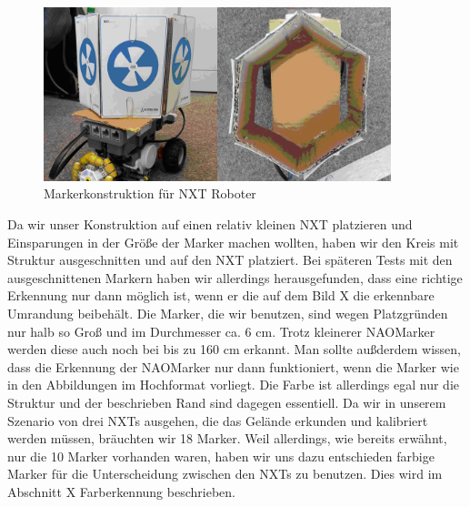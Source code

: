 \begin{figure}[ht]
    \centering
  \includegraphics[width=0.9\textwidth, angle=0]{img/nao_8.png}
    \caption{Markerkonstruktion für NXT Roboter}
    \label{nao_marker2}
\end{figure}

Da wir unser Konstruktion auf einen relativ kleinen NXT platzieren und Einsparungen in der Größe der Marker machen wollten, haben wir den Kreis mit Struktur ausgeschnitten und auf den NXT platziert. Bei späteren Tests mit den ausgeschnittenen Markern haben wir allerdings herausgefunden, dass eine richtige Erkennung nur dann möglich ist, wenn er die auf dem Bild X die erkennbare Umrandung beibehält. Die Marker, die wir benutzen, sind wegen Platzgründen nur halb so Groß und im Durchmesser ca. 6 cm. Trotz kleinerer NAOMarker werden diese auch noch bei bis zu  160 cm erkannt. Man sollte außderdem wissen, dass die Erkennung der NAOMarker nur dann funktioniert, wenn die Marker wie in den Abbildungen im Hochformat vorliegt. Die Farbe ist allerdings egal nur die Struktur und der beschrieben Rand sind dagegen essentiell.
Da wir in unserem Szenario von drei NXTs ausgehen, die das Gelände erkunden und kalibriert werden müssen, bräuchten wir 18 Marker. Weil allerdings, wie bereits erwähnt, nur die 10 Marker vorhanden waren, haben wir uns dazu entschieden farbige Marker für die Unterscheidung zwischen den NXTs zu benutzen. Dies wird im Abschnitt X Farberkennung beschrieben.

